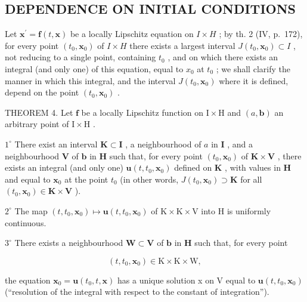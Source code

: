 \subsection{DEPENDENCE ON INITIAL CONDITIONS}

Let \(\mathbf{x}^{\prime}=\mathbf{f}(t,\mathbf{x})\) be a locally Lipschitz equation on \(I\times H\) ; by th. 2 (IV, p.~172), for every point \((t_{0},\mathbf{x}_{0})\) of \(I\times H\) there exists a largest interval \(J(t_{0},\mathbf{x}_{0})\subset I\) , not reducing to a single point, containing \(t_{0}\) , and on which there exists an integral (and only one) of this equation, equal to \(x_{0}\) at \(t_{0}\) ; we shall clarify the manner in which this integral, and the interval \(J(t_{0},\mathbf{x}_{0})\) where it is defined, depend on the point \((t_{0},\mathbf{x}_{0})\) .

THEOREM 4. Let \(\mathbf{f}\) be a locally Lipschitz function on \(\mathrm{I} \times \mathrm{H}\) and \((a, \mathbf{b})\) an arbitrary point of \(\mathrm{I} \times \mathrm{H}\) .

\(1^{\circ}\) There exist an interval \(\mathbf{K} \subset \mathbf{I}\) , a neighbourhood of \(a\) in \(\mathbf{I}\) , and a neighbourhood \(\mathbf{V}\) of \(\mathbf{b}\) in \(\mathbf{H}\) such that, for every point \((t_0, \mathbf{x}_0)\) of \(\mathbf{K} \times \mathbf{V}\) , there exists an integral (and only one) \(\mathbf{u}(t, t_0, \mathbf{x}_0)\) defined on \(\mathbf{K}\) , with values in \(\mathbf{H}\) and equal to \(\mathbf{x}_0\) at the point \(t_0\) (in other words, \(J(t_0, \mathbf{x}_0) \supset \mathbf{K}\) for all \((t_0, \mathbf{x}_0) \in \mathbf{K} \times \mathbf{V}\) ).

\(2^{\circ}\) The map \((t,t_0,\mathbf{x}_0)\mapsto \mathbf{u}(t,t_0,\mathbf{x}_0)\) of \(\mathrm{K}\times \mathrm{K}\times \mathrm{V}\) into H is uniformly continuous.

\(3^{\circ}\) There exists a neighbourhood \(\mathbf{W} \subset \mathbf{V}\) of \(\mathbf{b}\) in \(\mathbf{H}\) such that, for every point

\[
(t, t _ {0}, \mathbf {x} _ {0}) \in \mathrm{K} \times \mathrm{K} \times \mathrm{W},
\]

the equation \(\mathbf{x}_{0} = \mathbf{u}(t_{0}, t, \mathbf{x})\) has a unique solution x on V equal to \(\mathbf{u}(t, t_{0}, \mathbf{x}_{0})\) (``resolution of the integral with respect to the constant of integration'').

